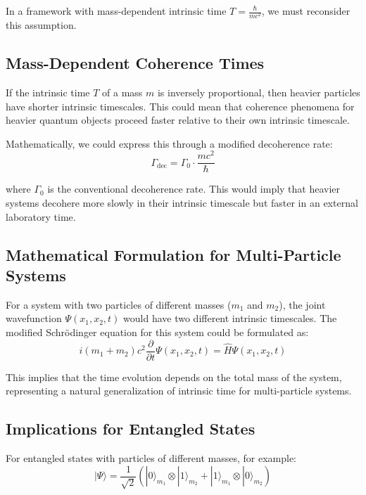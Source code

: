 \documentclass{article}
\begin{document}
	In a framework with mass-dependent intrinsic time $T = \frac{\hbar}{mc^2}$, we must reconsider this assumption.
	
	\subsection{Mass-Dependent Coherence Times}
	
	If the intrinsic time $T$ of a mass $m$ is inversely proportional, then heavier particles have shorter intrinsic timescales. This could mean that coherence phenomena for heavier quantum objects proceed faster relative to their own intrinsic timescale.
	
	Mathematically, we could express this through a modified decoherence rate:
	\begin{equation}
		\Gamma_{\text{dec}} = \Gamma_0 \cdot \frac{mc^2}{\hbar}
	\end{equation}
	
	where $\Gamma_0$ is the conventional decoherence rate. This would imply that heavier systems decohere more slowly in their intrinsic timescale but faster in an external laboratory time.
	
	\subsection{Mathematical Formulation for Multi-Particle Systems}
	
	For a system with two particles of different masses ($m_1$ and $m_2$), the joint wavefunction $\Psi(x_1, x_2, t)$ would have two different intrinsic timescales. The modified Schrödinger equation for this system could be formulated as:
	\begin{equation}
		i (m_1 + m_2) c^2 \frac{\partial}{\partial t} \Psi(x_1, x_2, t) = \hat{H} \Psi(x_1, x_2, t)
	\end{equation}
	
	This implies that the time evolution depends on the total mass of the system, representing a natural generalization of intrinsic time for multi-particle systems.
	
	\subsection{Implications for Entangled States}
	
	For entangled states with particles of different masses, for example:
	\begin{equation}
		|\Psi\rangle = \frac{1}{\sqrt{2}}(|0\rangle_{m_1} \otimes |1\rangle_{m_2} + |1\rangle_{m_1} \otimes |0\rangle_{m_2})
	\end{equation}
	
\end{document}
